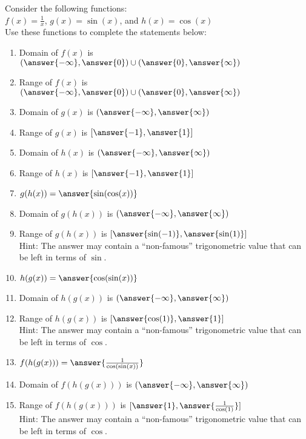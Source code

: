\documentclass{ximera}
\author{David Kish}
\begin{document}
\begin{exercise}
Consider the following functions:\\
$f(x)=\frac{1}{x}$, $g(x)=\sin(x)$, and $h(x)=\cos(x)$ \\
Use these functions to complete the statements below:
\begin{enumerate}
\item Domain of $f(x)$ is $(\answer{-\infty},\answer{0}) \cup (\answer{0},\answer{\infty})$
\item Range of $f(x)$ is $(\answer{-\infty},\answer{0}) \cup (\answer{0},\answer{\infty})$
\item Domain of $g(x)$ is $(\answer{-\infty},\answer{\infty})$
\item Range of $g(x)$ is $[\answer{-1},\answer{1}]$
\item Domain of $h(x)$ is $(\answer{-\infty},\answer{\infty})$
\item Range of $h(x)$ is $[\answer{-1},\answer{1}]$
\item $g(h(x))=\answer{\sin(\cos(x))}$
\item Domain of $g(h(x))$ is $(\answer{-\infty},\answer{\infty})$
\item Range of $g(h(x))$ is $[\answer{\sin(-1)},\answer{\sin(1)}]$\\
Hint: The answer may contain a ``non-famous'' trigonometric value that can be left in terms of $\sin$.
\item $h(g(x))=\answer{\cos(\sin(x))}$
\item Domain of $h(g(x))$ is $(\answer{-\infty},\answer{\infty})$
\item Range of $h(g(x))$ is $[\answer{\cos(1)},\answer{1}]$\\
Hint: The answer may contain a ``non-famous'' trigonometric value that can be left in terms of $\cos$.
\item $f(h(g(x)))=\answer{\frac{1}{\cos(\sin(x))}}$
\item Domain of $f(h(g(x)))$ is $(\answer{-\infty},\answer{\infty})$
\item Range of $f(h(g(x)))$ is $[\answer{1},\answer{\frac{1}{\cos(1)}}]$\\ 
Hint: The answer may contain a ``non-famous'' trigonometric value that can be left in terms of $\cos$.
 \end{enumerate} 
\end{exercise}
\end{document}
